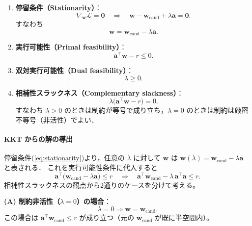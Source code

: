 \documentclass[uplatex]{jsarticle}
\begin{document}
\begin{enumerate}
 \item \textbf{停留条件（Stationarity）}：
       \[
         \nabla_{\boldsymbol{w}}\mathcal{L} = \boldsymbol{0}
         \quad\Longrightarrow\quad
         \boldsymbol{w} - \boldsymbol{w}_{\mathrm{cand}} + \lambda \boldsymbol{a} = \boldsymbol{0}.
       \]
       すなわち
       \begin{equation}\label{eq:stationarity}
         \boldsymbol{w} = \boldsymbol{w}_{\mathrm{cand}} - \lambda \boldsymbol{a}.
       \end{equation}

 \item \textbf{実行可能性（Primal feasibility）}：
       \[
         \boldsymbol{a}^\top\boldsymbol{w} - r \le 0.
       \]

 \item \textbf{双対実行可能性（Dual feasibility）}：
       \[
         \lambda \ge 0.
       \]

 \item \textbf{相補性スラックネス（Complementary slackness）}：
       \[
         \lambda\big(\boldsymbol{a}^\top\boldsymbol{w} - r\big) = 0.
       \]
       すなわち \(\lambda>0\) のときは制約が等号で成り立ち，\(\lambda=0\) のときは制約は厳密不等号（非活性）でよい．
\end{enumerate}

\paragraph{KKT からの解の導出}
停留条件(\ref{eq:stationarity})より，任意の \(\lambda\) に対して \(\boldsymbol{w}\) は
\(\boldsymbol{w}(\lambda)=\boldsymbol{w}_{\mathrm{cand}}-\lambda\boldsymbol{a}\) と表される．
これを実行可能性条件に代入すると
\[
\boldsymbol{a}^\top\big(\boldsymbol{w}_{\mathrm{cand}} - \lambda\boldsymbol{a}\big) \le r
\quad\Longrightarrow\quad
\boldsymbol{a}^\top\boldsymbol{w}_{\mathrm{cand}} - \lambda \,\boldsymbol{a}^\top\boldsymbol{a} \le r.
\]
相補性スラックネスの観点から2通りのケースを分けて考える。

\medskip\noindent
\textbf{(A) 制約非活性（\(\lambda=0\)）の場合}：
\[
\lambda=0 \Rightarrow \boldsymbol{w}=\boldsymbol{w}_{\mathrm{cand}}.
\]
この場合は \(\boldsymbol{a}^\top\boldsymbol{w}_{\mathrm{cand}}\le r\) が成り立つ（元の $\boldsymbol{w}_{\mathrm{cand}}$ が既に半空間内）。
\end{document}
